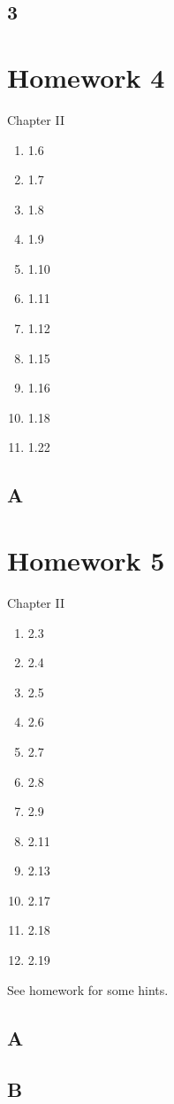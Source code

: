 \documentclass[12pt]{article}
\begin{document}
\subsection{3}

\section{Homework 4}

Chapter II
\begin{enumerate}
\item 1.6
\item 1.7
\item 1.8
\item 1.9
\item 1.10
\item 1.11
\item 1.12
\item 1.15
\item 1.16
\item 1.18
\item 1.22
\end{enumerate}

\subsection{A}

\section{Homework 5}
Chapter II
\begin{enumerate}
\item 2.3
\item 2.4
\item 2.5
\item 2.6
\item 2.7
\item 2.8
\item 2.9
\item 2.11
\item 2.13
\item 2.17
\item 2.18
\item 2.19
\end{enumerate}
See homework for some hints.

\subsection{A}

\subsection{B}
\end{document}
